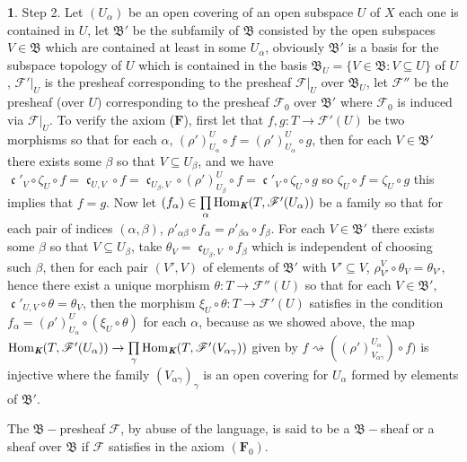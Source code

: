 \documentclass[12pt]{amsart}
\newcommand{\Hom}{\operatorname{Hom}}
\newcommand{\can}{\operatorname{\mathfrak{c}}}
\theoremstyle{definition}
\newtheorem{bk}[proposition]{}
\begin{document}
\begin{bk}
Step 2. Let $(U_{\alpha})$ be an open covering of an open subspace $U$ of $X$ each one is contained in $U$, let $\mathfrak{B}'$ be the subfamily of $\mathfrak{B}$ consisted by the open subspaces $V\in\mathfrak{B}$ which are contained at least in some $U_{\alpha}$, obviously $\mathfrak{B}'$ is a basis for the subspace topology of $U$ which is contained in the basis $\mathfrak{B}_{U}=\{V\in\mathfrak{B} : V\subseteq U\}$ of $U$, $\mathscr{F}'|_{U}$ is the presheaf corresponding to the presheaf $\mathscr{F}|_{U}$ over $\mathfrak{B}_{U}$, let $\mathscr{F}''$ be the presheaf (over $U$) corresponding to the presheaf $\mathscr{F}_{0}$ over $\mathfrak{B}'$ where $\mathscr{F}_{0}$ is induced via $\mathscr{F}|_{U}$. To verify the axiom  ($\textbf{F}$), first let that $f, g:T\rightarrow\mathscr{F}'(U)$ be two morphisms so that for each $\alpha$, $(\rho')_{U_{\alpha}}^{U}\circ f=(\rho')_{U_{\alpha}}^{U}\circ g$, then for each $V\in\mathfrak{B}'$ there exists some $\beta$ so that $V\subseteq U_{\beta}$, and we have $\can'_{V}\circ\zeta_{U}\circ f=\can_{U, V}\circ f=\can_{U_{\beta},V}\circ(\rho')_{U_{\beta}}^{U}\circ f=\can'_{V}\circ\zeta_{U}\circ g$ so $\zeta_{U}\circ f=\zeta_{U}\circ g$ this implies that $f=g$.  Now let $(f_{\alpha})\in\prod\limits_{\alpha}\Hom_{\emph{\textbf{K}}}(T, \mathscr{F}'(U_{\alpha}))$ be a family so that for each pair of indices $(\alpha, \beta)$, $\rho'_{\alpha\beta}\circ f_{\alpha}=\rho'_{\beta\alpha}\circ f_{\beta}$. For each $V\in\mathfrak{B}'$ there exists some $\beta$ so that $V\subseteq U_{\beta}$, take $\theta_{V}=\can_{U_{\beta}, V}\circ f_{\beta}$ which is independent of choosing such $\beta$, then for each pair $(V', V)$ of elements of $\mathfrak{B}'$ with $V'\subseteq V$,  $\rho_{V'}^{V}\circ\theta_{V}=\theta_{V'}$, hence there exist a unique morphism $\theta: T\rightarrow\mathscr{F}''(U)$ so that for each $V\in\mathfrak{B}'$, $\can'_{U, V}\circ\theta=\theta_{V}$, then the morphism $\xi_{U}\circ\theta:T\rightarrow\mathscr{F}'(U)$ satisfies in the condition $f_{\alpha}=(\rho')_{U_{\alpha}}^{U}\circ(\xi_{U}\circ\theta)$ for each $\alpha$, because as we showed above, the map $\Hom_{\emph{\textbf{K}}}(T, \mathscr{F}'(U_{\alpha}))\rightarrow
\prod\limits_{\gamma}\Hom_{\emph{\textbf{K}}}(T, \mathscr{F}'(V_{\alpha\gamma}))$ given by $f\rightsquigarrow((\rho')_{V_{\alpha\gamma}}^{U_{\alpha}})\circ f)$ is injective where the family $(V_{\alpha\gamma})_{\gamma}$
is an open covering for $U_{\alpha}$ formed by elements of $\mathfrak{B}'$.


The $\mathfrak{B}-$presheaf  $\mathscr{F}$, by abuse of the language, is said to be a $\mathfrak{B}-$sheaf or a sheaf over $\mathfrak{B}$ if $\mathscr{F}$ satisfies in the axiom $(\textbf{F}_{0})$.

\end{bk}
\end{document}
